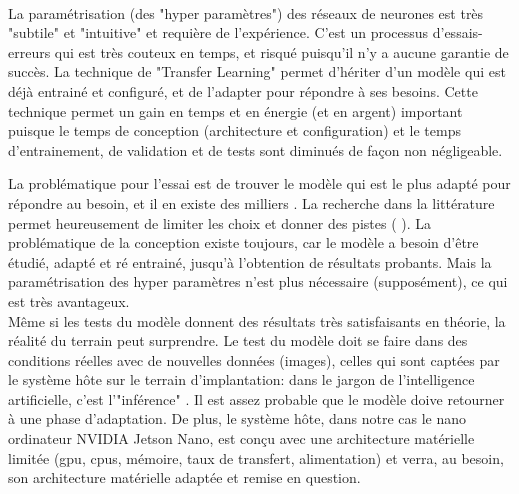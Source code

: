 \vspace{\baselineskip}
\\
\noindent La paramétrisation (des "hyper paramètres") des réseaux de neurones est très "subtile" et "intuitive" et requière de l'expérience. C'est un processus d'essais-erreurs qui est très couteux en temps, et risqué puisqu'il n'y a aucune garantie de succès. La technique de "Transfer Learning" permet d'hériter d'un modèle qui est déjà entrainé et configuré, et de l'adapter pour répondre à ses besoins. Cette technique permet un gain en temps et en énergie (et en argent) important puisque le temps de conception (architecture et configuration) et le temps d'entrainement, de validation et de tests sont diminués de façon non négligeable.
\begin{comment}
Par exemple le modèle "VGG" prend 2-3 semaines d'entrainement \cite{simonyan_very_2015} avec 4 \acrshort{gpu} Titan Black (NVIDIA), coutant 1,200\$US (Amazon.com) chacun (pour un total de 4,800\$US, et cela juste pour les \acrshort{gpu}s, qui ne sont qu'un des éléments de l'infrastructure nécessaire). Étant donné que de multiples tentatives sont nécessaires (cycles essai-erreur), la stratégie est d'entrainer plusieurs modèles en parallèle afin d'accélérer le développement, ce qui implique un cout élevé en infrastructure.
\end{comment}
La problématique pour l'essai est de trouver le modèle qui est le plus adapté pour répondre au besoin, et il en existe des milliers \cite{koh_model_2018}. La recherche dans la littérature permet heureusement de limiter les choix et donner des pistes (\cite{zheng_real-time_2020} \cite{nguyen_mavnet_2019} \cite{nvidia_jetson_2019-1}). La problématique de la conception existe toujours, car le modèle a besoin d'être étudié, adapté et ré entrainé, jusqu'à l'obtention de résultats probants. Mais la paramétrisation des hyper paramètres n'est plus nécessaire (supposément), ce qui est très avantageux.
\vspace{\baselineskip}
\\
\noindent Même si les tests du modèle donnent des résultats très satisfaisants en théorie, la réalité du terrain peut surprendre. Le test du modèle doit se faire dans des conditions réelles avec de nouvelles données (images), celles qui sont captées par le système hôte sur le terrain d'implantation: dans le jargon de l'intelligence artificielle, c'est l'"inférence" \cite{copel_whats_2016} \cite{nvidia_jetson_2019-1}. Il est assez probable que le modèle doive retourner à une phase d'adaptation. De plus, le système hôte, dans notre cas le nano ordinateur NVIDIA Jetson Nano, est conçu avec une architecture matérielle limitée (\acrshort{gpu}, \acrshort{cpu}s, mémoire, taux de transfert, alimentation) et verra, au besoin, son architecture matérielle adaptée et remise en question.